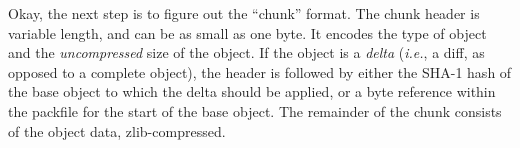\documentclass{article}
\begin{document}
Okay, the next step is to figure out the ``chunk'' format.  The chunk
header is variable length, and can be as small as one byte. It encodes
the type of object and the \emph{uncompressed} size of the object. If
the object is a \textit{delta} (\textit{i.e.}, a diff, as opposed to a
complete object), the header is followed by either the SHA-1 hash of
the base object to which the delta should be applied, or a byte
reference within the packfile for the start of the base object. The
remainder of the chunk consists of the object data, zlib-compressed.
\begin{center}
{\newcount\bitnum{}
}
\end{center}
\end{document}
